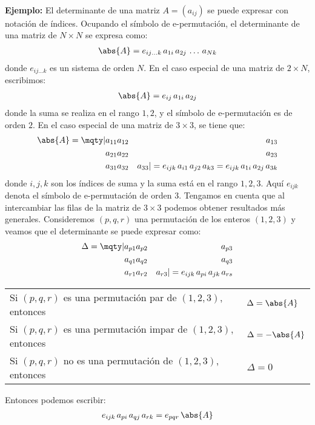 \\[0.5em]
\noindent
\textbf{Ejemplo: } El determinante de una matriz $A = (a_{ij})$ se puede expresar con notación de índices. Ocupando el símbolo de e-permutación, el determinante de una matriz de $N \times N$ se expresa como:
\begin{align*}
    \abs{A} = e_{ij  \ldots k} \, a_{1i} \, a_{2j} \, \ldots \, a_{Nk}
\end{align*}
donde $e_{ij \ldots k}$ es un sistema de orden $N$. En el caso especial de una matriz de $2 \times N$, escribimos:
\begin{align*}
\abs{A} = e_{ij} \, a_{1i} \, a_{2j}
\end{align*}
donde la suma se realiza en el rango $1, 2$, y el símbolo de e-permutación es de orden $2$. En el caso especial de una matriz de $3 \times 3$, se tiene que:
\begin{align*}
\abs{A} = \mqty|
a_{11} & a_{12} & a_{13} \\
a_{21} & a_{22} & a_{23} \\
a_{31} & a_{32} & a_{33}
| = e_{ijk} \, a_{i1} \, a_{j2} \, a_{k3} = e_{ijk} \, a_{1i} \, a_{2j} \, a_{3k}
\end{align*}
donde $i, j, k$ son los índices de suma y la suma está en el rango $1, 2, 3$. Aquí $e_{ijk}$ denota el símbolo de e-permutación de orden $3$. Tengamos en cuenta que al intercambiar las filas de la matriz de $3 \times 3$ podemos obtener resultados más generales. Consideremos $(p,q, r)$ una permutación de los enteros $(1, 2, 3)$ y veamos que el determinante se puede expresar como:
\begin{align*}
\Delta = \mqty|
a_{p1} & a_{p2} & a_{p3} \\
a_{q1} & a_{q2} & a_{q3} \\
a_{r1} & a_{r2} & a_{r3}
| = e_{ijk} \, a_{pi} \, a_{jk} \, a_{rs}
\end{align*}
\begin{table}[H]
\large
\centering
\begin{tabular}{l l}
Si $(p, q, r)$ es una permutación par de $(1, 2, 3)$, entonces   & $\Delta = \abs{A}$  \\
Si $(p, q, r)$ es una permutación impar de $(1, 2, 3)$, entonces & $\Delta = -\abs{A}$ \\
Si $(p, q, r)$ no es una permutación de $(1, 2, 3)$, entonces    & $\Delta = 0$
\end{tabular}
\end{table}
Entonces podemos escribir:
\begin{align*}
e_{ijk} \, a_{pi} \, a_{qj} \, a_{rk} = e_{pqr} \, \abs{A}
\end{align*}

